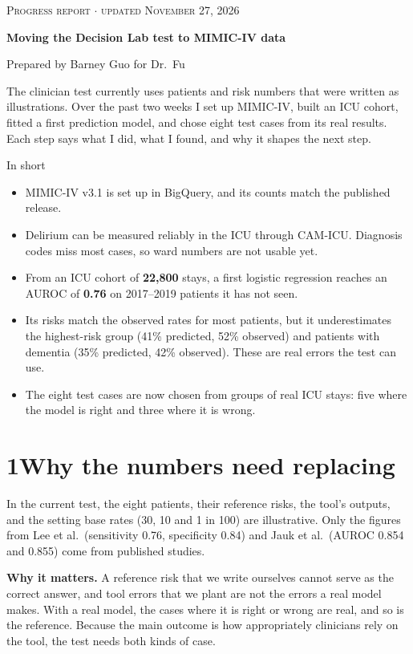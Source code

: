 \documentclass[11pt]{article}
\newcommand{\why}[1]{\begin{whynote}\textbf{\color{accent}Why it matters.} #1\end{whynote}}
\newcommand{\step}[2]{\section*{\color{accent}#1\quad\color{black}#2}}
\begin{document}
{\small\color{accent}\textsc{Progress report $\cdot$ updated November 27, 2026}}

{\LARGE\bfseries Moving the Decision Lab test to MIMIC-IV data\par}

\vspace{0.3em}
{\color{black!60}Prepared by Barney Guo for Dr.\ Fu}

The clinician test currently uses patients and risk numbers that were written as illustrations. Over the past two weeks I set up MIMIC-IV, built an ICU cohort, fitted a first prediction model, and chose eight test cases from its real results. Each step says what I did, what I found, and why it shapes the next step.

\begin{plainbox}{In short}
\begin{itemize}
	\item MIMIC-IV v3.1 is set up in BigQuery, and its counts match the published release.
	\item Delirium can be measured reliably in the ICU through CAM-ICU. Diagnosis codes miss most cases, so ward numbers are not usable yet.
	\item From an ICU cohort of \textbf{22,800} stays, a first logistic regression reaches an AUROC of \textbf{0.76} on 2017--2019 patients it has not seen.
	\item Its risks match the observed rates for most patients, but it underestimates the highest-risk group (41\% predicted, 52\% observed) and patients with dementia (35\% predicted, 42\% observed). These are real errors the test can use.
	\item The eight test cases are now chosen from groups of real ICU stays: five where the model is right and three where it is wrong.
\end{itemize}
\end{plainbox}

\step{1}{Why the numbers need replacing}

In the current test, the eight patients, their reference risks, the tool's outputs, and the setting base rates (30, 10 and 1 in 100) are illustrative. Only the figures from Lee et al.\ (sensitivity 0.76, specificity 0.84) and Jauk et al.\ (AUROC 0.854 and 0.855) come from published studies.

\why{A reference risk that we write ourselves cannot serve as the correct answer, and tool errors that we plant are not the errors a real model makes. With a real model, the cases where it is right or wrong are real, and so is the reference. Because the main outcome is how appropriately clinicians rely on the tool, the test needs both kinds of case.}
\end{document}
